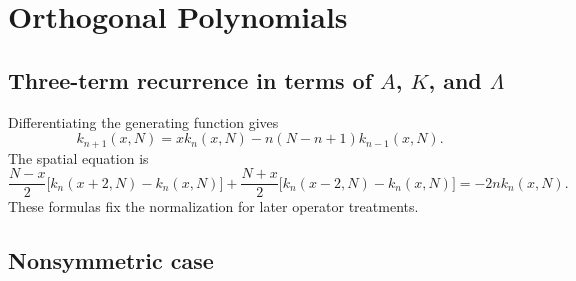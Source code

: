 \chapter{Orthogonal Polynomials}
\label{ch:13}
\section{Three-term recurrence in terms of $A$, $K$, and $\Lambda$}
\label{sec:13-1}
Differentiating the generating function gives
\[
k_{n+1}(x,N)=xk_n(x,N)-n(N-n+1)k_{n-1}(x,N).
\]
The spatial equation is
\[
\frac{N-x}{2}\bigl[k_n(x+2,N)-k_n(x,N)\bigr]
+\frac{N+x}{2}\bigl[k_n(x-2,N)-k_n(x,N)\bigr]
=-2n k_n(x,N).
\]
These formulas fix the normalization for later operator treatments.

\section{Nonsymmetric case}
\label{sec:13-2}

